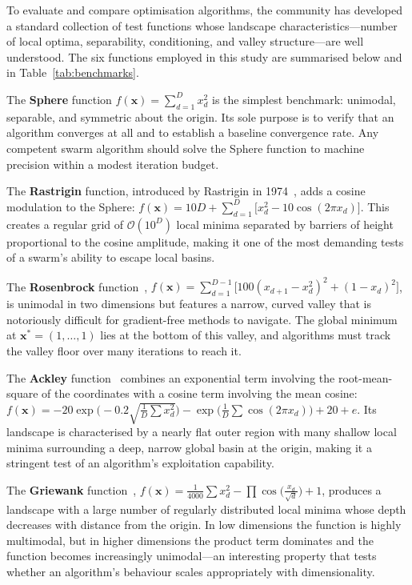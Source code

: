 To evaluate and compare optimisation algorithms, the community has developed a
standard collection of test functions whose landscape characteristics---number
of local optima, separability, conditioning, and valley structure---are well
understood.  The six functions employed in this study are summarised below and
in Table~\ref{tab:benchmarks}.

The \textbf{Sphere} function $f(\mathbf{x}) = \sum_{d=1}^{D} x_d^2$ is the
simplest benchmark: unimodal, separable, and symmetric about the origin.  Its
sole purpose is to verify that an algorithm converges at all and to establish a
baseline convergence rate.  Any competent swarm algorithm should solve the
Sphere function to machine precision within a modest iteration budget.

The \textbf{Rastrigin} function, introduced by Rastrigin in
1974~\cite{Rastrigin1974}, adds a cosine modulation to the Sphere:
$f(\mathbf{x}) = 10D + \sum_{d=1}^{D}\bigl[x_d^2 - 10\cos(2\pi x_d)\bigr]$.
This creates a regular grid of $\mathcal{O}(10^D)$ local minima separated by
barriers of height proportional to the cosine amplitude, making it one of the
most demanding tests of a swarm's ability to escape local basins.

The \textbf{Rosenbrock} function~\cite{Rosenbrock1960},
$f(\mathbf{x}) = \sum_{d=1}^{D-1}\bigl[100(x_{d+1} - x_d^2)^2
+ (1 - x_d)^2\bigr]$, is unimodal in two dimensions but features a narrow,
curved valley that is notoriously difficult for gradient-free methods to
navigate.  The global minimum at $\mathbf{x}^* = (1,\ldots,1)$ lies at the
bottom of this valley, and algorithms must track the valley floor over many
iterations to reach it.

The \textbf{Ackley} function~\cite{Ackley1987} combines an exponential term
involving the root-mean-square of the coordinates with a cosine term involving
the mean cosine:
$f(\mathbf{x}) = -20\exp\bigl(-0.2\sqrt{\frac{1}{D}\sum x_d^2}\bigr)
- \exp\bigl(\frac{1}{D}\sum\cos(2\pi x_d)\bigr) + 20 + e$.
Its landscape is characterised by a nearly flat outer region with many shallow
local minima surrounding a deep, narrow global basin at the origin, making it a
stringent test of an algorithm's exploitation capability.

The \textbf{Griewank} function~\cite{Griewank1981},
$f(\mathbf{x}) = \frac{1}{4000}\sum x_d^2
- \prod\cos\bigl(\frac{x_d}{\sqrt{d}}\bigr) + 1$,
produces a landscape with a large number of regularly distributed local
minima whose depth decreases with distance from the origin.  In low dimensions
the function is highly multimodal, but in higher dimensions the product term
dominates and the function becomes increasingly unimodal---an interesting
property that tests whether an algorithm's behaviour scales appropriately with
dimensionality.

